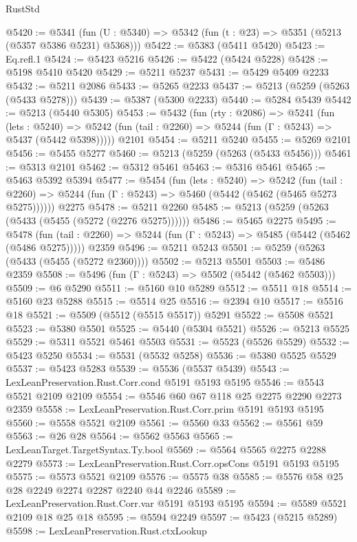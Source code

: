 \begin{lexlean}{RustStd}
\begin{coremodule}
@5420 := @5341 (fun (U : @5340) => @5342 (fun (t : @23) => @5351 (@5213 (@5357 @5386 @5231) @5368)))
@5422 := @5383 (@5411 @5420)
@5423 := Eq.refl.{1}
@5424 := @5423 @5216
@5426 := @5422 (@5424 @5228)
@5428 := @5198 @5410 @5420
@5429 := @5211 @5237
@5431 := @5429 @5409 @2233
@5432 := @5211 @2086
@5433 := @5265 @2233
@5437 := @5213 (@5259 (@5263 (@5433 @5278)))
@5439 := @5387 (@5300 @2233)
@5440 := @5284 @5439
@5442 := @5213 (@5440 @5305)
@5453 := @5432
    (fun (rty : @2086) =>
    @5241
      (fun (lets : @5240) =>
      @5242 (fun (tail : @2260) => @5244 (fun (Γ : @5243) => @5437 (@5442 @5398)))))
    @2101
@5454 := @5211 @5240
@5455 := @5269 @2101
@5456 := @5455 @5277
@5460 := @5213 (@5259 (@5263 (@5433 @5456)))
@5461 := @5313 @2101
@5462 := @5312 @5461
@5463 := @5316 @5461
@5465 := @5463 @5392 @5394
@5477 := @5454
    (fun (lets : @5240) =>
    @5242
      (fun (tail : @2260) => @5244 (fun (Γ : @5243) => @5460 (@5442 (@5462 (@5465 @5273 @5275))))))
    @2275
@5478 := @5211 @2260
@5485 := @5213 (@5259 (@5263 (@5433 (@5455 (@5272 (@2276 @5275))))))
@5486 := @5465 @2275
@5495 := @5478
    (fun (tail : @2260) => @5244 (fun (Γ : @5243) => @5485 (@5442 (@5462 (@5486 @5275)))))
    @2359
@5496 := @5211 @5243
@5501 := @5259 (@5263 (@5433 (@5455 (@5272 @2360))))
@5502 := @5213 @5501
@5503 := @5486 @2359
@5508 := @5496 (fun (Γ : @5243) => @5502 (@5442 (@5462 @5503)))
@5509 := @6 @5290
@5511 := @5160 @10 @5289
@5512 := @5511 @18
@5514 := @5160 @23 @5288
@5515 := @5514 @25
@5516 := @2394 @10
@5517 := @5516 @18
@5521 := @5509 (@5512 (@5515 @5517)) @5291
@5522 := @5508 @5521
@5523 := @5380 @5501
@5525 := @5440 (@5304 @5521)
@5526 := @5213 @5525
@5529 := @5311 @5521 @5461 @5503
@5531 := @5523 (@5526 @5529)
@5532 := @5423 @5250
@5534 := @5531 (@5532 @5258)
@5536 := @5380 @5525 @5529
@5537 := @5423 @5283
@5539 := @5536 (@5537 @5439)
@5543 := LexLeanPreservation.Rust.Corr.cond @5191 @5193 @5195
@5546 := @5543 @5521 @2109 @2109
@5554 := @5546 @60 @67 @118 @25 @2275 @2290 @2273 @2359
@5558 := LexLeanPreservation.Rust.Corr.prim @5191 @5193 @5195
@5560 := @5558 @5521 @2109
@5561 := @5560 @33
@5562 := @5561 @59
@5563 := @26 @28
@5564 := @5562 @5563
@5565 := LexLeanTarget.TargetSyntax.Ty.bool
@5569 := @5564 @5565 @2275 @2288 @2279
@5573 := LexLeanPreservation.Rust.Corr.opsCons @5191 @5193 @5195
@5575 := @5573 @5521 @2109
@5576 := @5575 @38
@5585 := @5576 @58 @25 @28 @2249 @2274 @2287 @2240 @44 @2246
@5589 := LexLeanPreservation.Rust.Corr.var @5191 @5193 @5195
@5594 := @5589 @5521 @2109 @18 @25 @18
@5595 := @5594 @2249
@5597 := @5423 (@5215 @5289)
@5598 := LexLeanPreservation.Rust.ctxLookup

\end{coremodule}
\end{lexlean}
